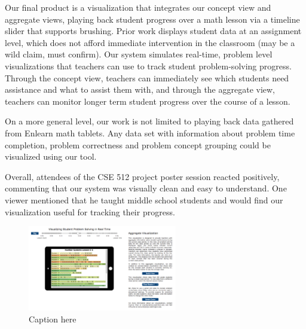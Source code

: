 \documentclass{sigchi}
\begin{document}
Our final product is a visualization that integrates our concept view and aggregate views, playing back student progress over a math lesson via a timeline slider that supports brushing. Prior work displays student data at an assignment level, which does not afford immediate intervention in the classroom (may be a wild claim, must confirm). Our system simulates real-time, problem level visualizations that teachers can use to track student problem-solving progress. Through the concept view, teachers can immediately see which students need assistance and what to assist them with, and through the aggregate view, teachers can monitor longer term student progress over the course of a lesson. 

On a more general level, our work is not limited to playing back data gathered from Enlearn math tablets. Any data set with information about problem time completion, problem correctness and problem concept grouping could be visualized using our tool.

Overall, attendees of the CSE 512 project poster session reacted positively, commenting that our system was visually clean and easy to understand. One viewer mentioned that he taught middle school students and would find our visualization useful for tracking their progress. %

\begin{figure}[t]
\centering
\includegraphics[width=65mm]{images/results1.pdf}
\caption{Caption here}
\label{fig:Results1}
\end{figure}
\end{document}
